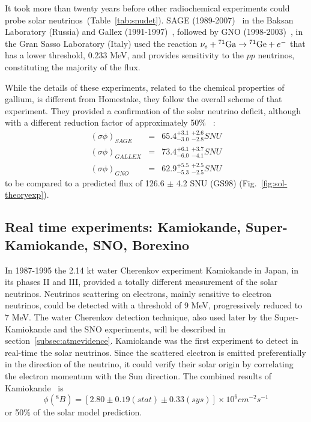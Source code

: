 It took more than twenty years before other radiochemical experiments could probe solar neutrinos~(Table~\ref{tab:snudet}). SAGE (1989-2007)~\cite{abdurashitov} in the Baksan Laboratory (Russia) and Gallex (1991-1997)~\cite{hampel}, followed by GNO (1998-2003)~\cite{altmann}, in the Gran Sasso Laboratory (Italy) used the reaction  $\nu_e  + {}^{71}{\rm Ga} \rightarrow {}^{71}{\rm Ge} + e^-$
that has a lower threshold, 0.233 MeV, and provides sensitivity to the $pp$ neutrinos, constituting the majority of the flux. 

While the details of these experiments, related to the chemical properties of gallium, is different from Homestake, they follow the overall scheme of that experiment. They provided a confirmation of the solar neutrino deficit, although with a different reduction factor of approximately 50\% ~\cite{abdurashitov,hampel,altmann,kaether}:
\begin{eqnarray}
(\sigma \phi)_{SAGE} & = & 65.4^{+3.1} _{-3.0} \; ^{+2.6} _{-2.8}  SNU \\
(\sigma \phi)_{GALLEX} & = & 73.4  ^{+6.1}_{-6.0} \; ^{+3.7} _{-4.1} SNU \\
(\sigma \phi)_{GNO} & = & 62.9  ^{+5.5} _{-5.3} \; ^{+2.5} _{-2.5} SNU 
\end{eqnarray}
to be compared to a predicted flux of 126.6 $\pm$ 4.2 SNU (GS98) (Fig.~\ref{fig:sol-theoryexp}).


\subsection{Real time experiments: Kamiokande, Super-Kamiokande, SNO, Borexino}

In 1987-1995 the 2.14 kt water Cherenkov experiment Kamiokande in Japan, in its phases II and III, provided a totally different measurement of the solar neutrinos. Neutrinos scattering on electrons, mainly sensitive to electron neutrinos, could be detected with a threshold of 9 MeV, progressively reduced to 7 MeV.  
The water Cherenkov detection technique, also used later by the Super-Kamiokande and the SNO experiments, will be described in section~\ref{subsec:atmevidence}.   
Kamiokande was the first experiment to detect in real-time the solar neutrinos. Since the scattered electron is emitted preferentially in the direction of the neutrino, it could verify their solar origin by correlating the electron momentum with the Sun direction. The combined results of Kamiokande~\cite{fukuda} is
\begin{equation}
\phi( ^8 B) = [2.80 \pm 0.19 (stat) \pm 0.33 (sys)] \times 10^6 cm^{-2} s^{-1}
\end{equation}
or 50\% of the solar model prediction.

